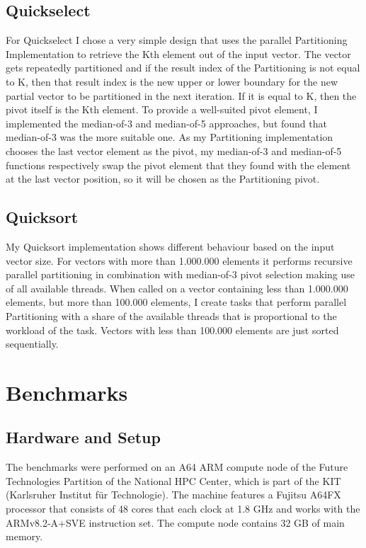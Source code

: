 \documentclass[sigconf]{acmart}
\begin{document}
\subsection{Quickselect}
\label{sub:sec:quickselect}

For Quickselect I chose a very simple design that uses the parallel Partitioning Implementation to retrieve the Kth element out of the input vector. The vector gets repeatedly partitioned and if the result index of the Partitioning is not equal to K, then that result index is the new upper or lower boundary for the new partial vector to be partitioned in the next iteration. If it is equal to K, then the pivot itself is the Kth element. To provide a well-suited pivot element, I implemented the median-of-3 and median-of-5 approaches, but found that median-of-3 was the more suitable one. As my Partitioning implementation chooses the last vector element as the pivot, my median-of-3 and median-of-5 functions respectively swap the pivot element that they found with the element at the last vector position, so it will be chosen as the Partitioning pivot.

\subsection{Quicksort}
\label{sub:sec:quicksort}

My Quicksort implementation shows different behaviour based on the input vector size. For vectors with more than 1.000.000 elements it performs recursive parallel partitioning in combination with median-of-3 pivot selection making use of all available threads. When called on a vector containing less than 1.000.000 elements, but more than 100.000 elements, I create tasks that perform parallel Partitioning with a share of the available threads that is proportional to the workload of the task. Vectors with less than 100.000 elements are just sorted sequentially.

\section{Benchmarks}

\subsection{Hardware and Setup}
\label{sub:sec:setup}

The benchmarks were performed on an A64 ARM compute node of the Future Technologies Partition of the National HPC Center, which is part of the KIT (Karlsruher Institut für Technologie). The machine features a Fujitsu A64FX processor that consists of 48 cores that each clock at 1.8 GHz and works with the ARMv8.2-A+SVE instruction set. The compute node contains 32 GB of main memory.
\end{document}
